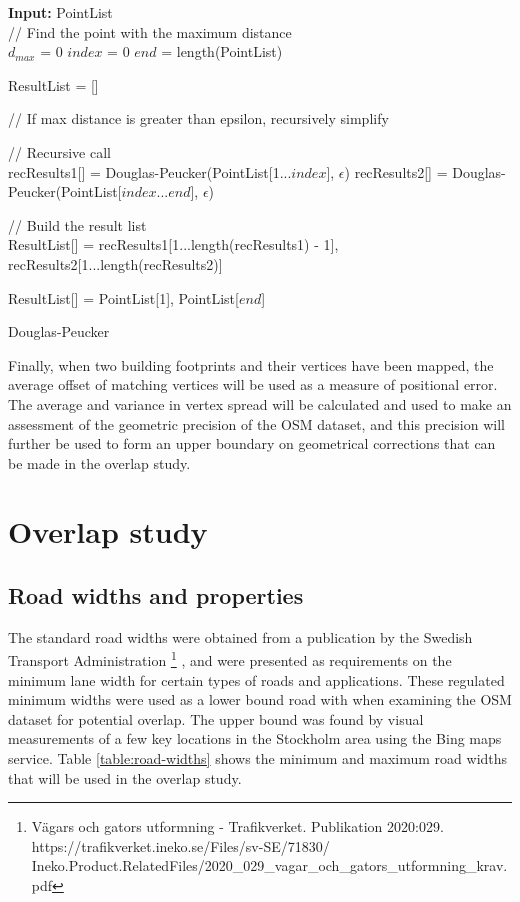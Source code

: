 \documentclass{kththesis}
\begin{document}
\begin{algorithm}[H]
\SetAlgoLined
{}
    \textbf{Input:} PointList\\
    // Find the point with the maximum distance\\
    $d_{max}$ = 0\;
    $index$ = 0\;
    $end$ = length(PointList)\;
    

    ResultList = []\;
    
    // If max distance is greater than epsilon, recursively simplify\\
     {
        // Recursive call\\
        recResults1[] = Douglas-Peucker(PointList[1...$index$], $\epsilon$)\;
        recResults2[] = Douglas-Peucker(PointList[$index$...$end$], $\epsilon$)\;

        // Build the result list\\
        ResultList[] = {recResults1[1...length(recResults1) - 1], recResults2[1...length(recResults2)]}\;
    }{
        ResultList[] = {PointList[1], PointList[$end$]}\;
    }
    \;

    \caption{Douglas-Peucker}
\end{algorithm}

Finally, when two building footprints and their vertices have been mapped, the average offset of matching vertices will be used as a measure of positional error.
The average and variance in vertex spread will be calculated and used to make an assessment of the geometric precision of the OSM dataset, and this precision will further be used to form an upper boundary on geometrical corrections that can be made in the overlap study.

\section{Overlap study}

\subsection{Road widths and properties}

The standard road widths were obtained from a publication by the Swedish Transport Administration
\footnote{Vägars och gators utformning - Trafikverket. Publikation 2020:029. https://trafikverket.ineko.se/Files/sv-SE/71830/\\Ineko.Product.RelatedFiles/2020\_029\_vagar\_och\_gators\_utformning\_krav.pdf}
, and were presented as requirements on the minimum lane width for certain types of roads and applications.
These regulated minimum widths were used as a lower bound road with when examining the OSM dataset for potential overlap.
The upper bound was found by visual measurements of a few key locations in the Stockholm area using the Bing maps service.
Table \ref{table:road-widths} shows the minimum and maximum road widths that will be used in the overlap study.
\end{document}
